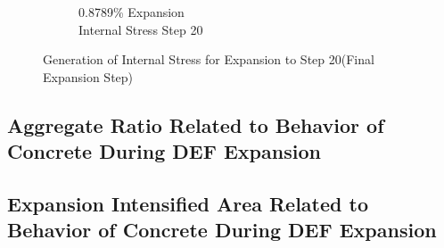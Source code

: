 \begin{figure}[ht!]
\begin{subfigure}{.25\textwidth}
      \caption{0.8789\% Expansion\\Internal Stress Step 20}
    \end{subfigure}

\caption{Generation of Internal Stress for Expansion to Step 20(Final Expansion Step)}
\label{fig:DEF_A30_X0C_stress}
\end{figure}

\subsection{Aggregate Ratio Related to Behavior of Concrete During DEF Expansion}


\subsection{Expansion Intensified Area Related to Behavior of Concrete During DEF Expansion}


